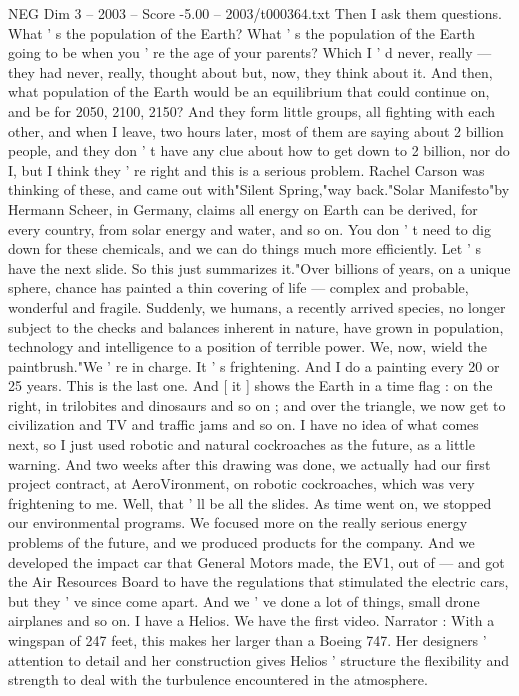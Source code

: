\begin{textsample}{NEG Dim 3 – 2003 – Score -5.00 – 2003/t000364.txt}
Then I ask them questions.
What ' s the population of the Earth?
What ' s the population of the Earth going to be when you ' re the age of your parents?
Which I ' d never, really — they had never, really, thought about but, now, they think about it.
And then, what population of the Earth would be an equilibrium that could continue on, and be for 2050, 2100, 2150?
And they form little groups, all fighting with each other, and when I leave, two hours later, most of them are saying about 2 billion people, and they don ' t have any clue about how to get down to 2 billion, nor do I, but I think they ' re right and this is a serious problem.
Rachel Carson was thinking of these, and came out with"Silent Spring,"way back."Solar Manifesto"by Hermann Scheer, in Germany, claims all energy on Earth can be derived, for every country, from solar energy and water, and so on.
You don ' t need to dig down for these chemicals, and we can do things much more efficiently.
Let ' s have the next slide.
So this just summarizes it."Over billions of years, on a unique sphere, chance has painted a thin covering of life — complex and probable, wonderful and fragile.
Suddenly, we humans, a recently arrived species, no longer subject to the checks and balances inherent in nature, have grown in population, technology and intelligence to a position of terrible power.
We, now, wield the paintbrush."We ' re in charge.
It ' s frightening.
And I do a painting every 20 or 25 years.
This is the last one.
And [ it ] shows the Earth in a time flag : on the right, in trilobites and dinosaurs and so on ; and over the triangle, we now get to civilization and TV and traffic jams and so on.
I have no idea of what comes next, so I just used robotic and natural cockroaches as the future, as a little warning.
And two weeks after this drawing was done, we actually had our first project contract, at AeroVironment, on robotic cockroaches, which was very frightening to me.
Well, that ' ll be all the slides.
As time went on, we stopped our environmental programs.
We focused more on the really serious energy problems of the future, and we produced products for the company.
And we developed the impact car that General Motors made, the EV1, out of — and got the Air Resources Board to have the regulations that stimulated the electric cars, but they ' ve since come apart.
And we ' ve done a lot of things, small drone airplanes and so on.
I have a Helios.
We have the first video.
Narrator : With a wingspan of 247 feet, this makes her larger than a Boeing 747.
Her designers ' attention to detail and her construction gives Helios ' structure the flexibility and strength to deal with the turbulence encountered in the atmosphere.

\end{textsample}
